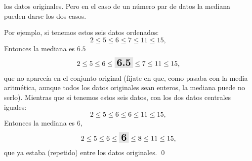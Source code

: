 los datos originales. Pero en el caso de un número par de datos la mediana
pueden darse los dos casos.
\begin{ejemplo}
\label{cap02:ejem:CalculoMediana}
Por ejemplo, si tenemos estos seis datos ordenados:
        \[
        2\leq 5\leq 6\leq 7\leq 11\leq 15,
        \]
Entonces la mediana es $6.5$
        \[
        2\leq 5\leq 6\leq\colorbox{lightgrey}{\mbox{\Large\bf 6.5}}\leq 7\leq 11\leq 15,
        \]
que no aparecía en el conjunto original (fíjate en que, como pasaba con la
media aritmética, aunque todos los datos originales sean enteros, la mediana
puede no serlo). Mientras que si tenemos estos seis datos, con los dos datos
centrales iguales:
        \[
        2\leq 5\leq 6\leq 6\leq 11\leq 15,
        \]
Entonces la mediana es $6$,
        \[
        2\leq 5\leq 6\leq\colorbox{lightgrey}{\mbox{\Large\bf 6}}\leq 8\leq 11\leq 15,
        \]
que ya estaba (repetido) entre los datos originales.
\qed
\end{ejemplo}


